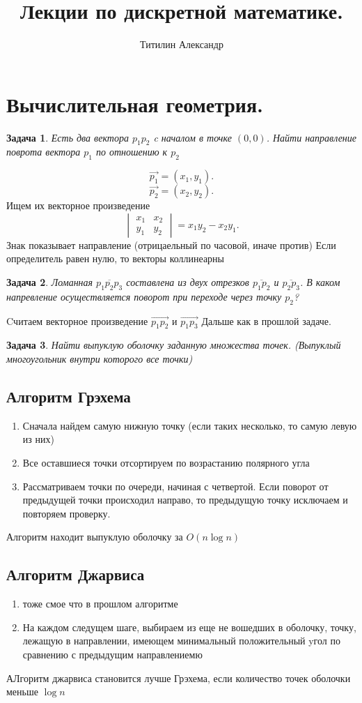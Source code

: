 \documentclass{scrartcl}
\title{Лекции по дискретной математике.}
\author{Титилин Александр}
\date{}
\newtheorem{task}{Задача}
\begin{document}
\maketitle
\section{Вычислительная геометрия.}
\begin{task}
    Есть два вектора $p_1 p_2$ c началом в точке $(0,0)$. Найти направление поврота вектора  $p_1$ по отношению к $p_2$ 
\end{task}
\[
\vec{p_1} = (x_1,y_1)
.\] 
\[
\vec{p_2} = (x_2,y_2)
.\] 
Ищем их векторное произведение
\[
    \begin{vmatrix}
        x_1 & x_2\\
        y_1 & y_2
    \end{vmatrix}  = x_1y_2 - x_2y_1
.\] 
Знак показывает направление (отрицаельный по часовой, иначе против)
Если определитель равен нулю, то векторы коллинеарны
\begin{task}
    Ломанная $\overline{p_1p_2p_3}$ составлена из двух отрезков $\overline{p_1p_2}$ и $\overline{p_2p_3}$. В каком напревление осуществляется поворот
    при переходе через точку $p_2$?
\end{task}
Cчитаем векторное произведение $\vec{p_1p_2}$ и $\vec{p_1p_3}$
Дальше как в прошлой задаче.
\begin{task}
	Найти выпуклую оболочку заданную множества точек. (Выпуклый многоугольник внутри которого все точки)
\end{task}
\subsection{Алгоритм Грэхема}
\begin{enumerate}
	\item Сначала найдем самую нижную точку (если таких несколько, то самую левую из них)
	\item Все оставшиеся точки отсортируем по возрастанию полярного угла
	\item Рассматриваем точки по очереди, начиная с четвертой. Если поворот от предыдущей точки происходил направо, то предыдущую точку исключаем и повторяем проверку.
\end{enumerate}
Алгоритм находит выпуклую оболочку за $O(n \log{n})$
\subsection{Алгоритм Джарвиса}
\begin{enumerate}
    \item тоже смое что в прошлом алгоритме
    \item На каждом следущем шаге, выбираем из
        еще не вошедших в оболочку, точку, лежащую в направлении, имеющем минимальный положительный yгол по сравнению с предыдущим направлениемю
\end{enumerate}
АЛгоритм джарвиса становится лучше Грэхема, если количество точек оболочки меньше $\log{n}$
\end{document}
